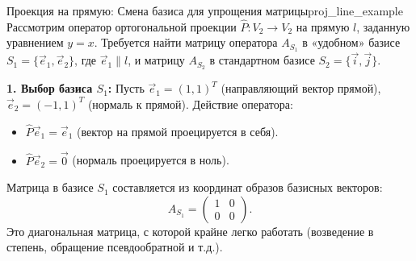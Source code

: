 \documentclass[12pt,a4paper]{article}
\begin{document}
\begin{definition}{Проекция на прямую: Смена базиса для упрощения
  матрицы}{proj_line_example}
  Рассмотрим оператор ортогональной проекции $\hat{P}: V_2 \to V_2$
  на прямую $l$, заданную уравнением $y=x$.
  Требуется найти матрицу оператора $A_{S_1}$ в «удобном» базисе
  $S_1=\{\vec{e}_1, \vec{e}_2\}$, где $\vec{e}_1 \parallel l$, и
  матрицу $A_{S_2}$ в стандартном базисе $S_2=\{\vec{i}, \vec{j}\}$.

  \textbf{1. Выбор базиса $S_1$:}
  Пусть $\vec{e}_1 = (1, 1)^T$ (направляющий вектор прямой),
  $\vec{e}_2 = (-1, 1)^T$ (нормаль к прямой).
  Действие оператора:
  \begin{itemize}
    \item $\hat{P}\vec{e}_1 = \vec{e}_1$ (вектор на прямой проецируется в себя).
    \item $\hat{P}\vec{e}_2 = \vec{0}$ (нормаль проецируется в ноль).
  \end{itemize}
  Матрица в базисе $S_1$ составляется из координат образов базисных векторов:
  \[
    A_{S_1} =
    \begin{pmatrix} 1 & 0 \\ 0 & 0
    \end{pmatrix}.
  \]
  Это диагональная матрица, с которой крайне легко работать
  (возведение в степень, обращение псевдообратной и т.д.).


\end{definition}
\end{document}
